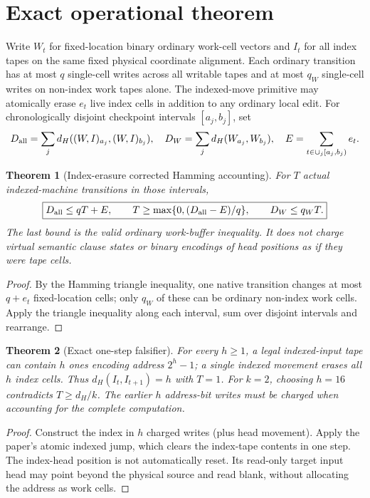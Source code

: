 \documentclass[10pt]{article}
\newtheorem{theorem}{Theorem}
\begin{document}
\section{Exact operational theorem}
Write \(W_t\) for fixed-location binary ordinary work-cell vectors and \(I_t\) for all index tapes on the same fixed physical coordinate alignment. Each ordinary transition has at most \(q\) single-cell writes across all writable tapes and at most \(q_W\) single-cell writes on non-index work tapes alone. The indexed-move primitive may atomically erase \(e_t\) live index cells in addition to any ordinary local edit. For chronologically disjoint checkpoint intervals \([a_j,b_j]\), set
\[
D_{\rm all}=\sum_jd_H((W,I)_{a_j},(W,I)_{b_j}),\quad
D_W=\sum_jd_H(W_{a_j},W_{b_j}),\quad E=\sum_{t\in\cup_j[a_j,b_j)}e_t.
\]
\begin{theorem}[Index-erasure corrected Hamming accounting]
For \(T\) actual indexed-machine transitions in those intervals,
\[
\boxed{D_{\rm all}\le qT+E,\qquad
T\ge\max\{0,(D_{\rm all}-E)/q\},\qquad D_W\le q_WT.}
\]
The last bound is the valid ordinary work-buffer inequality. It does not charge virtual semantic clause states or binary \emph{encodings} of head positions as if they were tape cells.
\end{theorem}
\begin{proof}
By the Hamming triangle inequality, one native transition changes at most \(q+e_t\) fixed-location cells; only \(q_W\) of these can be ordinary non-index work cells. Apply the triangle inequality along each interval, sum over disjoint intervals and rearrange.
\end{proof}
\begin{theorem}[Exact one-step falsifier]
For every \(h\ge1\), a legal indexed-input tape can contain \(h\) ones encoding address \(2^h-1\); a single indexed movement erases all \(h\) index cells. Thus \(d_H(I_t,I_{t+1})=h\) with \(T=1\). For \(k=2\), choosing \(h=16\) contradicts \(T\ge d_H/k\). The earlier \(h\) address-bit writes \emph{must} be charged when accounting for the complete computation.
\end{theorem}
\begin{proof}
Construct the index in \(h\) charged writes (plus head movement). Apply the paper's atomic indexed jump, which clears the index-tape contents in one step. The index-head position is not automatically reset. Its read-only target input head may point beyond the physical source and read blank, without allocating the address as work cells.
\end{proof}
\end{document}
